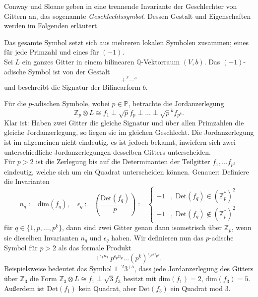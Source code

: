 \documentclass[12pt,a4paper,halfparskip,headsepline,bibtotocnumbered]{scrreprt}
\theoremstyle{nummermitklammern}
\theoremstyle{nonumberbreak}
\newcommand{\Z}{\mathbb{Z}}
\newcommand{\Q}{\mathbb{Q}}
\renewcommand{\P}{\mathbb{P}}
\newcommand{\Det}{\text{Det}}
\begin{document}
Conway und Sloane geben in\cite[Kap. 15, Abs. 7]{conway} eine trennende Invariante der Geschlechter von Gittern an, das sogenannte \textit{Geschlechtssymbol}. Dessen Gestalt und Eigenschaften werden im Folgenden erläutert.\par
Das gesamte Symbol setzt sich aus mehreren lokalen Symbolen zusammen; eines für jede Primzahl und eines für $(-1)$.\\
Sei $L$ ein ganzes Gitter in einem bilinearen $\Q$-Vektorraum $(V,b)$. Das $(-1)$-adische Symbol ist von der Gestalt
\begin{equation*}
	+^r -^s
\end{equation*}
und beschreibt die Signatur der Bilinearform $b$.\par
Für die $p$-adischen Symbole, wobei $p \in \P$, betrachte die Jordanzerlegung
\begin{equation*}
	\Z_p \otimes L \cong f_1 \perp \sqrt{p} f_p \perp \dots \perp \sqrt{p}^k f_{p^k}.
\end{equation*}
Klar ist: Haben zwei Gitter die gleiche Signatur und über allen Primzahlen die gleiche Jordanzerlegung, so liegen sie im gleichen Geschlecht. Die Jordanzerlegung ist im allgemeinen nicht eindeutig, es ist jedoch bekannt, inwiefern sich zwei unterschiedliche Jordanzerlegungen desselben Gitters unterscheiden.\\
Für $p > 2$ ist die Zerlegung bis auf die Determinanten der Teilgitter $f_1, \dots f_{p^k}$ eindeutig, welche sich um ein Quadrat unterscheiden können. Genauer: Definiere die Invarianten
\begin{equation*}
	n_q := \text{dim}(f_q), \quad \epsilon_q := \left( \frac{\Det(f_q)}{p} \right) := \begin{cases} +1 &,\ \Det(f_q) \in (\Z_p^\ast)^2 \\ -1 &,\ \Det(f_q) \not\in (\Z_p^\ast)^2 \end{cases}
\end{equation*}
für $q \in \lbrace 1, p, \dots, p^k \rbrace$, dann sind zwei Gitter genau dann isometrisch über $\Z_p$, wenn sie dieselben Invarianten $n_q$ und $\epsilon_q$ haben. Wir definieren nun das $p$-adische Symbol für $p > 2$ als das formale Produkt
\begin{equation*}
	1^{\epsilon_1 n_1}\ p^{\epsilon_p n_p} \dots \left(p^k\right)^{\epsilon_{p^k} n_{p^k}}.
\end{equation*}
Beispielsweise bedeutet das Symbol $1^{-2} 3^{+5}$, dass jede Jordanzerlegung des Gitters über $\Z_3$ die Form $\Z_3 \otimes L \cong f_1 \perp \sqrt{3} f_3$ besitzt mit $\text{dim}(f_1) = 2$, $\text{dim}(f_3) = 5$. Außerdem ist $\Det(f_1)$ kein Quadrat, aber $\Det(f_3)$ ein Quadrat mod $3$.\par
\end{document}
